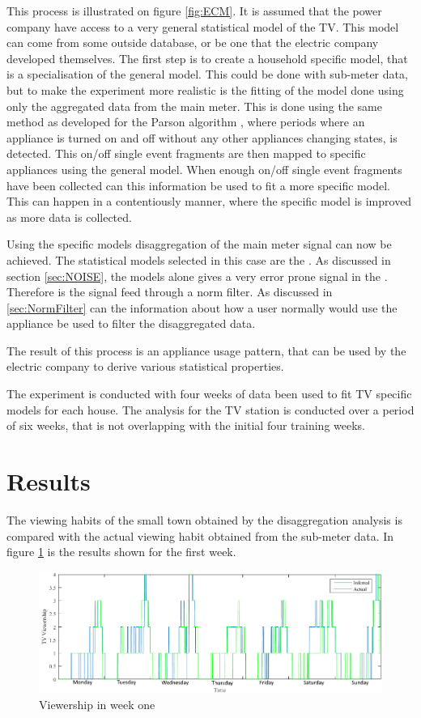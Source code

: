 This process is illustrated on figure \ref{fig:ECM}. It is assumed that the power company have access to a very general statistical model of the TV. This model can come from some outside database, or be one that the electric company developed themselves. The first step is to create a household specific model, that is a specialisation of the general model. This could be done with sub-meter data, but to make the experiment more realistic is the fitting of the model done using only the aggregated data from the main meter. This is done using the same method as developed for the Parson algorithm \citep{RefWorks:28}, where periods where an appliance is turned on and off without any other appliances changing states, is detected. This on/off single event fragments are then mapped to specific appliances using the general model. When enough on/off single event fragments have been collected can this information be used to fit a more specific model. This can happen in a contentiously manner, where the specific model is improved as more data is collected.  

Using the specific models disaggregation of the main meter signal can now be achieved. The statistical models selected in this case are the . As discussed in section \ref{sec:NOISE}, the models alone gives a very error prone signal in the . Therefore is the signal feed through a norm filter. As discussed in \ref{sec:NormFilter} can the information about how a user normally would use the appliance be used to filter the disaggregated data. 

The result of this process is an appliance usage pattern, that can be used by the electric company to derive various statistical properties.  

The experiment is conducted with four weeks of data been used to fit TV specific models for each house. The analysis for the TV station is conducted over a period of six weeks, that is not overlapping with the initial four training weeks. 

\section{Results}
The viewing habits of the small town obtained by the disaggregation analysis is compared with the actual viewing habit obtained from the sub-meter data. In figure \ref{fig:WHW} is the results shown for the first week.   

\begin{figure}[H]
\centering
\includegraphics[width=1\textwidth]{billeder/Viewership.png}
\caption{Viewership in week one}
\label{fig:WHW}
\end{figure}

